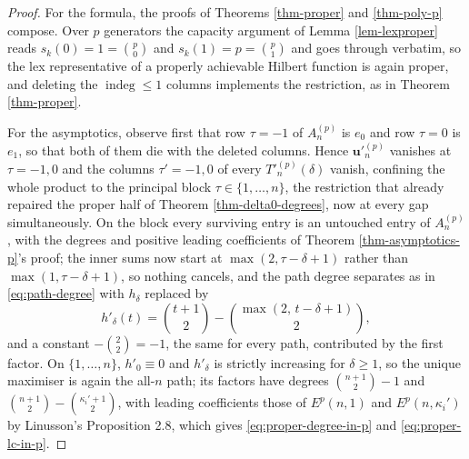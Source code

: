 \documentclass[11pt, a4paper, abstract=yes]{scrartcl}
\theoremstyle{definition}
\theoremstyle{remark}
\theoremstyle{plain}
\newcommand{\vek}[1]{\boldsymbol{#1}}
\newcommand{\indeg}{\operatorname{indeg}}
\begin{document}
\begin{proof}
For the formula, the proofs of Theorems \ref{thm-proper} and \ref{thm-poly-p} compose. Over \(p\)
generators the capacity argument of Lemma \ref{lem-lexproper} reads \(s_k(0)=1=\binom p0\) and
\(s_k(1)=p=\binom p1\) and goes through verbatim, so the lex representative of a properly
achievable Hilbert function is again proper, and deleting the \(\indeg\le1\) columns implements
the restriction, as in Theorem \ref{thm-proper}.

For the asymptotics, observe first that row \(\tau=-1\) of \(A^{(p)}_n\) is \(e_0\) and row
\(\tau=0\) is \(e_1\), so that both of them die with the deleted columns. Hence \(\vek u'^{(p)}_n\) vanishes at \(\tau=-1,0\) and the columns
\(\tau'=-1,0\) of every \(T'^{(p)}_n(\delta)\) vanish, confining the whole product to the principal
block \(\tau\in\lbrace1,\dots,n\rbrace\), the restriction that already repaired the proper half of
Theorem \ref{thm-delta0-degrees}, now at every gap simultaneously. On the block every surviving
entry is an untouched entry of \(A^{(p)}_n\), with the degrees and positive leading coefficients of
Theorem \ref{thm-asymptotics-p}'s proof; the inner sums now start at \(\max(2,\tau-\delta+1)\)
rather than \(\max(1,\tau-\delta+1)\), so nothing cancels, and the path degree separates as in
\eqref{eq:path-degree} with \(h_\delta\) replaced by
\begin{equation}\label{eq:h-prime}
  h'_\delta(t)=\binom{t+1}{2}-\binom{\max(2,\,t-\delta+1)}{2} ,
\end{equation}
and a constant \(-\binom22=-1\), the same for every path, contributed by the first factor. On \(\lbrace1,\dots,n\rbrace\), \(h'_0\equiv0\) and \(h'_\delta\)
is strictly increasing for \(\delta\ge1\), so the unique maximiser is again the all-\(n\) path;
its factors have degrees \(\binom{n+1}{2}-1\) and \(\binom{n+1}{2}-\binom{\kappa_i'+1}{2}\), with leading
coefficients those of \(E^p(n,1)\) and \(E^p(n,\kappa_i')\) by Linusson's Proposition 2.8, which
gives \eqref{eq:proper-degree-in-p} and \eqref{eq:proper-lc-in-p}.
\end{proof}
\end{document}
